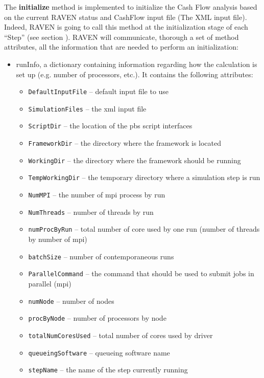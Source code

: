 The \textbf{initialize} method is implemented  to initialize the Cash Flow analysis based on
the current RAVEN status and CashFlow input file (The XML input file).
%
 \\Indeed, RAVEN is going to call this method at the initialization stage of each ``Step'' (see section \cite{RAVENuserManual}).
%
RAVEN will communicate, thorough a set of method attributes, all the information
that are needed to perform an initialization:
\begin{itemize}
  \item runInfo, a dictionary containing information regarding how the
  calculation is set up (e.g. number of processors, etc.).
  It contains the following attributes:
  \begin{itemize}
    \item \texttt{DefaultInputFile} -- default input file to use
    \item \texttt{SimulationFiles} -- the xml input file
    \item \texttt{ScriptDir} -- the location of the pbs script interfaces
    \item \texttt{FrameworkDir} -- the directory where the framework is located
    \item \texttt{WorkingDir} -- the directory where the framework should be
    running
    \item \texttt{TempWorkingDir} -- the temporary directory where a simulation
    step is run
    \item \texttt{NumMPI} -- the number of mpi process by run
    \item \texttt{NumThreads} -- number of threads by run
    \item \texttt{numProcByRun} -- total number of core used by one run (number
    of threads by number of mpi)
    \item \texttt{batchSize} -- number of contemporaneous runs
    \item \texttt{ParallelCommand} -- the command that should be used to submit
    jobs in parallel (mpi)
    \item \texttt{numNode} -- number of nodes
    \item \texttt{procByNode} -- number of processors by node
    \item \texttt{totalNumCoresUsed} -- total number of cores used by driver
    \item \texttt{queueingSoftware} -- queueing software name
    \item \texttt{stepName} -- the name of the step currently running

\end{itemize}
\end{itemize}
